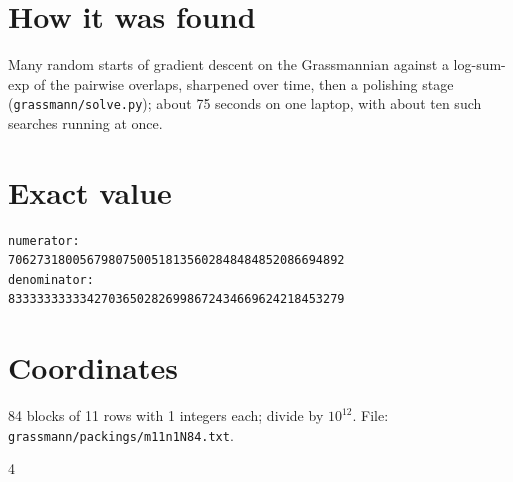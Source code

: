 \documentclass[11pt,a4paper]{article}
\begin{document}
\section{How it was found}
Many random starts of gradient descent on the Grassmannian against a log-sum-exp of the pairwise overlaps, sharpened over time, then a polishing stage (\texttt{grassmann/solve.py}); about 75 seconds on one laptop, with about ten such searches running at once.


\appendix
\section{Exact value}
{\small
\begin{verbatim}
numerator:
70627318005679807500518135602848484852086694892
denominator:
83333333333427036502826998672434669624218453279
\end{verbatim}}

\section{Coordinates}
84 blocks of 11 rows with 1 integers each; divide by $10^{12}$. File: \texttt{grassmann/packings/m11n1N84.txt}.
{\tiny
\begin{multicols}{4}
\end{multicols}}
\end{document}
